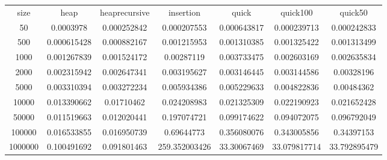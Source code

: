 \begin{table}
\begin{tabular}{ccccccc}
size & heap & heaprecursive & insertion & quick & quick100 & quick50 \\
50 & 0.0003978 & 0.000252842 & 0.000207553 & 0.000643817 & 0.000239713 & 0.000242833 \\
500 & 0.000615428 & 0.000882167 & 0.001215953 & 0.001310385 & 0.001325422 & 0.001313499 \\
1000 & 0.001267839 & 0.001524172 & 0.00287119 & 0.003733475 & 0.002603169 & 0.002635834 \\
2000 & 0.002315942 & 0.002647341 & 0.003195627 & 0.003146445 & 0.003144586 & 0.00328196 \\
5000 & 0.003310394 & 0.003272234 & 0.005934386 & 0.005229633 & 0.004822836 & 0.00484362 \\
10000 & 0.013390662 & 0.01710462 & 0.024208983 & 0.021325309 & 0.022190923 & 0.021652428 \\
50000 & 0.011519663 & 0.012020441 & 0.197074721 & 0.099174622 & 0.094072075 & 0.096792049 \\
100000 & 0.016533855 & 0.016950739 & 0.69644773 & 0.356080076 & 0.343005856 & 0.34397153 \\
1000000 & 0.100491692 & 0.091801463 & 259.352003426 & 33.30067469 & 33.079817714 & 33.792895479 \\
\end{tabular}
\end{table}
